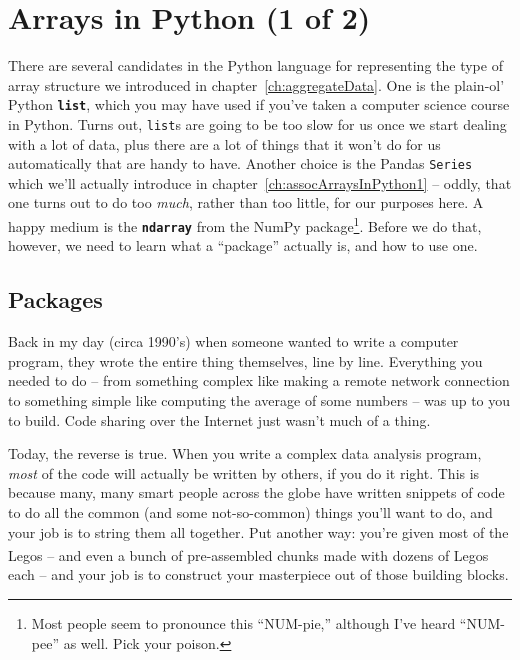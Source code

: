 
\chapter{Arrays in Python (1 of 2)}
\label{ch:arraysInPython1}

There are several candidates in the Python language for representing the type
of array structure we introduced in chapter~\ref{ch:aggregateData}. One is the
plain-ol' Python \textbf{\texttt{list}}, which you may have used if you've
taken a computer science course in Python. Turns out, \texttt{list}s are going
to be too slow for us once we start dealing with a lot of data, plus there are
a lot of things that it won't do for us automatically that are handy to have.
Another choice is the Pandas \texttt{Series} which we'll actually introduce in
chapter~\ref{ch:assocArraysInPython1} -- oddly, that one turns out to do too
\textit{much}, rather than too little, for our purposes here. A happy medium is
the \textbf{\texttt{ndarray}} from the NumPy package\footnote{Most people seem
to pronounce this ``NUM-pie,'' although I've heard ``NUM-pee'' as well. Pick
your poison.}. Before we do that, however, we need to learn what a ``package''
actually is, and how to use one.

\section{Packages}

Back in my day (circa 1990's) when someone wanted to write a computer program,
they wrote the entire thing themselves, line by line. Everything you needed to
do -- from something complex like making a remote network connection to
something simple like computing the average of some numbers -- was up to you to
build. Code sharing over the Internet just wasn't much of a thing.

Today, the reverse is true. When you write a complex data analysis program,
\textit{most} of the code will actually be written by others, if you do it
right. This is because many, many smart people across the globe have written
snippets of code to do all the common (and some not-so-common) things you'll
want to do, and your job is to string them all together. Put another way:
you're given most of the Legos\textsuperscript{\textregistered} -- and even a
bunch of pre-assembled chunks made with dozens of
Legos\textsuperscript{\textregistered} each -- and your job is to construct
your masterpiece out of those building blocks.

